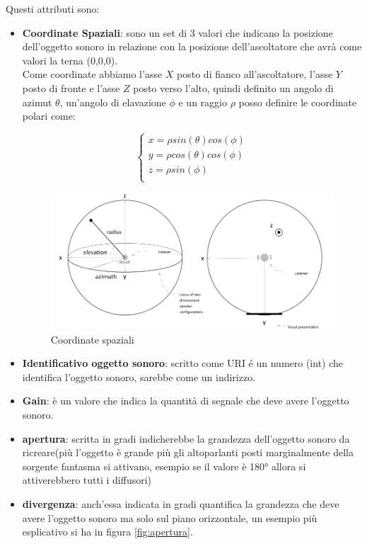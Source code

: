 \documentclass[12pt,a4paper]{report}
\begin{document}
Questi attributi sono:
\begin{itemize}\label{aaa}
\item \textbf{Coordinate Spaziali}: sono un set di 3 valori che indicano la posizione dell'oggetto sonoro in relazione con la posizione dell'ascoltatore che avrà come valori la terna (0,0,0).\\

Come coordinate abbiamo l'asse $X$ posto di fianco all'ascoltatore, l'asse $Y$ posto di fronte e l'asse $Z$ posto verso l'alto, quindi definito un angolo di azimut $\theta$, un'angolo di elavazione $\phi$ e un raggio $\rho$
posso definire le coordinate polari come:

\begin{equation}
	\left\{\begin{matrix}
x=\rho sin(\theta) cos(\phi) \\
y=\rho cos(\theta) cos(\phi)\\
z=\rho sin(\phi)\\
\end{matrix}\right.
	\label{eq:coordinatepolari}
\end{equation}

\begin{figure}[htbp]
	\centering
	\includegraphics[scale=0.35]{figures/azimut.png}
	\caption {Coordinate spaziali} 
	\label{fig:coordinate}
	\end{figure}
	
\item \textbf{Identificativo oggetto sonoro}: scritto come URI é un numero (int) che identifica l'oggetto sonoro, sarebbe come un indirizzo.
\item \textbf{Gain}: è un valore che indica la quantità di segnale che deve avere l'oggetto sonoro.
\item \textbf{apertura}: scritta in gradi indicherebbe la grandezza dell'oggetto sonoro da ricreare(più l'oggetto è grande più gli altoparlanti posti marginalmente della sorgente fantasma si attivano, esempio se il valore è 180° allora si attiverebbero tutti i diffusori)
\item \textbf{divergenza}: anch'essa indicata in gradi quantifica la grandezza che deve avere l'oggetto sonoro ma solo sul piano orizzontale, un esempio più esplicativo si ha in figura \ref{fig:apertura}.
	

\end{itemize}
\end{document}
